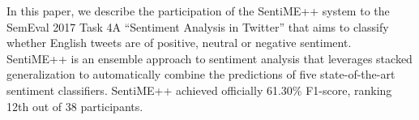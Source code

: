 In this paper, we describe the participation of the SentiME++ system to the SemEval 2017 Task 4A ``Sentiment Analysis in Twitter'' that aims to classify whether English tweets are of positive, neutral or negative sentiment. SentiME++ is an ensemble approach to sentiment analysis that leverages stacked generalization to automatically combine the predictions of five state-of-the-art sentiment classifiers. SentiME++ achieved officially 61.30\% F1-score, ranking 12th out of 38 participants.
